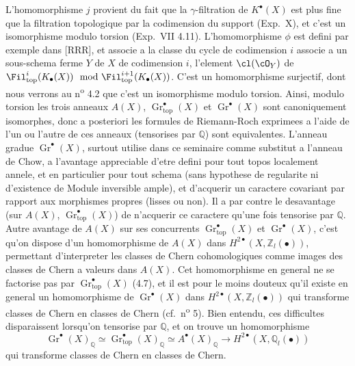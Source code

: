 L'homomorphisme $j$ provient du fait que la $\gamma$-filtration de $K^{\bullet}(X)$ est plus fine que la filtration topologique par la codimension du support (Exp.\ X), et c'est un isomorphisme modulo torsion (Exp.\ VII 4.11). L'homomorphisme $\phi$ est defini par exemple dans [RRR], et associe a la classe du cycle de codimension $i$ associe a un sous-schema ferme $Y$ de $X$ de codimension $i$, l'element $\cl(\cO_Y)$ de $\Fil_{\mathrm{top}}^i(K_{\bullet}(X)) \mod \Fil_{\mathrm{top}}^{i+1}(K_{\bullet}(X))$. C'est un homomorphisme surjectif, dont nous verrons au n\textsuperscript{o} 4.2 que c'est un isomorphisme modulo torsion. Ainsi, modulo torsion les trois anneaux $A(X)$, $\operatorname{Gr}_{\mathrm{top}}^{\bullet}(X)$ et $\operatorname{Gr}^{\bullet}(X)$ sont canoniquement isomorphes, donc a posteriori les formules de Riemann-Roch exprimees a l'aide de l'un ou l'autre de ces anneaux (tensorises par $\mathbb{Q}$) sont equivalentes. L'anneau gradue $\operatorname{Gr}^{\bullet}(X)$, surtout utilise dans ce seminaire comme substitut a l'anneau de Chow, a l'avantage appreciable d'etre defini pour tout topos localement annele, et en particulier pour tout schema (sans hypothese de regularite ni d'existence de Module inversible ample), et d'acquerir un caractere covariant par rapport aux morphismes propres (lisses ou non). Il a par contre le desavantage (sur $A(X)$, $\operatorname{Gr}_{\mathrm{top}}^{\bullet}(X)$) de n'acquerir ce caractere qu'une fois tensorise par $\mathbb{Q}$. Autre avantage de $A(X)$ sur ses concurrents $\operatorname{Gr}_{\mathrm{top}}^{\bullet}(X)$ et $\operatorname{Gr}^{\bullet}(X)$, c'est qu'on dispose d'un homomorphisme de $A(X)$ dans $H^{2\bullet}(X, \mathbb{Z}_l(\bullet))$, permettant d'interpreter les classes de Chern cohomologiques comme images des classes de Chern a valeurs dans $A(X)$. Cet homomorphisme en general ne se factorise pas par $\operatorname{Gr}_{\mathrm{top}}^{\bullet}(X)$ (4.7), et il est pour le moins douteux qu'il existe en general un homomorphisme de $\operatorname{Gr}^{\bullet}(X)$ dans $H^{2\bullet}(X, \mathbb{Z}_l(\bullet))$ qui transforme classes de Chern en classes de Chern (cf.\ n\textsuperscript{o} 5). Bien entendu, ces difficultes disparaissent lorsqu'on tensorise par $\mathbb{Q}$, et on trouve un homomorphisme
\[
\operatorname{Gr}^{\bullet}(X)_{\mathbb{Q}} \simeq \operatorname{Gr}_{\mathrm{top}}^{\bullet}(X)_{\mathbb{Q}} \simeq A^{\bullet}(X)_{\mathbb{Q}} \longrightarrow H^{2\bullet}(X, \mathbb{Q}_l(\bullet)) \tag{4.2}
\]
qui transforme classes de Chern en classes de Chern.

